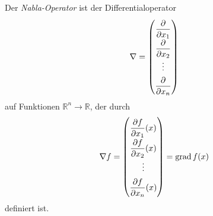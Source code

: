 \begin{definition}
\label{buch:fuvar:richtungsableitung:def:nabla}
Der {\em Nabla-Operator} ist der Differentialoperator
%
%
\[
\nabla 
=
{
\renewcommand{\arraystretch}{1.8}
\begin{pmatrix}
\displaystyle
\frac{\partial}{\partial x_1}\\
\displaystyle
\frac{\partial}{\partial x_2}\\
\vdots\\
\displaystyle
\frac{\partial}{\partial x_n}
\end{pmatrix}
}
\]
auf Funktionen
$\mathbb{R}^n\to\mathbb{R}$, der durch
\[
\nabla f
=
{
\renewcommand{\arraystretch}{1.9}
\begin{pmatrix}
\displaystyle
\frac{\partial f}{\partial x_1}(x)\\
\displaystyle
\frac{\partial f}{\partial x_2}(x)\\
\vdots\\
\displaystyle
\frac{\partial f}{\partial x_n}(x)
\end{pmatrix}
}
=
\operatorname{grad}f(x)
\]
definiert ist.
\end{definition}



